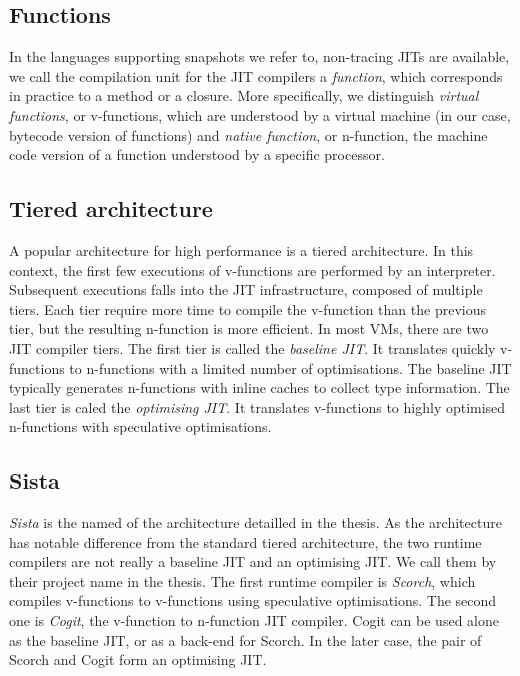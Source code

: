 \documentclass[a4paper,12pt,twoside]{../includes/ThesisStyle}
\begin{document}
\subsection{Functions}

In the languages supporting snapshots we refer to, non-tracing JITs are available, we call the compilation unit for the JIT compilers a \emph{function}, which corresponds in practice to a method or a closure. More specifically, we distinguish \emph{virtual functions}, or v-functions, which are understood by a virtual machine (in our case, bytecode version of functions) and \emph{native function}, or n-function, the machine code version of a function understood by a specific processor.

\subsection{Tiered architecture}

A popular architecture for high performance is a tiered architecture. In this context, the first few executions of v-functions are performed by an interpreter. Subsequent executions falls into the JIT infrastructure, composed of multiple tiers. Each tier require more time to compile the v-function than the previous tier, but the resulting n-function is more efficient. In most VMs, there are two JIT compiler tiers. The first tier is called the \emph{baseline JIT}. It translates quickly v-functions to n-functions with a limited number of optimisations. The baseline JIT typically generates n-functions with inline caches to collect type information. The last tier is caled the \emph{optimising JIT}. It translates v-functions to highly optimised n-functions with speculative optimisations.

\subsection{Sista}

\emph{Sista} is the named of the architecture detailled in the thesis. As the architecture has notable difference from the standard tiered architecture, the two runtime compilers are not really a baseline JIT and an optimising JIT. We call them by their project name in the thesis. The first runtime compiler is \emph{Scorch}, which compiles v-functions to v-functions using speculative optimisations. The second one is \emph{Cogit}, the v-function to n-function JIT compiler. Cogit can be used alone as the baseline JIT, or as a back-end for Scorch. In the later case, the pair of Scorch and Cogit form an optimising JIT.
\end{document}

